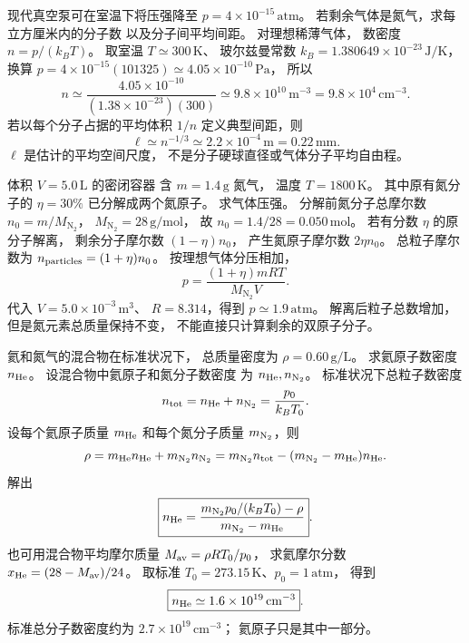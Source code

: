 现代真空泵可在室温下将压强降至
$p=4\times10^{-15}\,\mathrm{atm}$。
若剩余气体是氮气，求每立方厘米内的分子数
以及分子间平均间距。
\exsolution
对理想稀薄气体，
数密度 $n=p/(k_BT)$。
取室温 $T\simeq300\,\mathrm K$、
玻尔兹曼常数 $k_B=1.380649\times10^{-23}\,\mathrm{J/K}$，
换算
$p=4\times10^{-15}(101325)
\simeq4.05\times10^{-10}\,\mathrm{Pa}$，
所以
\[
n\simeq\frac{4.05\times10^{-10}}
{(1.38\times10^{-23})(300)}
\simeq9.8\times10^{10}\,\mathrm{m^{-3}}
=\boxed{9.8\times10^4\,\mathrm{cm^{-3}}}.
\]
若以每个分子占据的平均体积 $1/n$
定义典型间距，则
\[
\boxed{\ell\simeq n^{-1/3}
\simeq2.2\times10^{-4}\,\mathrm m=0.22\,\mathrm{mm}}.
\]
\excheck $\ell$ 是估计的平均空间尺度，
不是分子硬球直径或气体分子平均自由程。

体积 $V=5.0\,\mathrm L$ 的密闭容器
含 $m=1.4\,\mathrm g$ 氮气，
温度 $T=1800\,\mathrm K$。
其中原有氮分子的 $\eta=30\%$
已分解成两个氮原子。
求气体压强。
\exsolution
分解前氮分子总摩尔数
$n_0=m/M_{\mathrm{N_2}}$，
$M_{\mathrm{N_2}}=28\,\mathrm{g/mol}$，
故 $n_0=1.4/28=0.050\,\mathrm{mol}$。
若有分数 $\eta$ 的原分子解离，
剩余分子摩尔数 $(1-\eta)n_0$，
产生氮原子摩尔数 $2\eta n_0$。
总粒子摩尔数为
$n_{\rm particles}=(1+\eta)n_0$。
按理想气体分压相加，
\[
\boxed{p=\frac{(1+\eta)mRT}{M_{\mathrm{N_2}}V}}.
\]
代入
$V=5.0\times10^{-3}\,\mathrm{m^3}$、
$R=8.314$，得到
$\boxed{p\simeq1.9\,\mathrm{atm}}$。
\excheck 解离后粒子总数增加，
但是氮元素总质量保持不变，
不能直接只计算剩余的双原子分子。

氦和氮气的混合物在标准状况下，
总质量密度为
$\rho=0.60\,\mathrm{g/L}$。
求氦原子数密度 $n_{\rm He}$。
\exsolution
设混合物中氦原子和氮分子数密度
为 $n_{\rm He},n_{\mathrm N_2}$。
标准状况下总粒子数密度
\[
n_{\rm tot}=n_{\rm He}+n_{\mathrm N_2}
=\frac{p_0}{k_BT_0}.
\]
设每个氦原子质量 $m_{\rm He}$
和每个氮分子质量 $m_{\rm N_2}$，则
\[
\rho=m_{\rm He}n_{\rm He}
+m_{\rm N_2}n_{\mathrm N_2}
=m_{\rm N_2}n_{\rm tot}
-(m_{\rm N_2}-m_{\rm He})n_{\rm He}.
\]
解出
\[
\boxed{n_{\rm He}=
\frac{m_{\rm N_2}p_0/(k_BT_0)-\rho}
{m_{\rm N_2}-m_{\rm He}}}.
\]
也可用混合物平均摩尔质量
$M_{\rm av}=\rho RT_0/p_0$，
求氦摩尔分数
$x_{\rm He}=(28-M_{\rm av})/24$。
取标准 $T_0=273.15\,\mathrm K$、$p_0=1\,\mathrm{atm}$，
得到
\[
\boxed{n_{\rm He}\simeq1.6\times10^{19}\,\mathrm{cm^{-3}}}.
\]
\excheck 标准总分子数密度约为
$2.7\times10^{19}\,\mathrm{cm^{-3}}$；
氦原子只是其中一部分。

